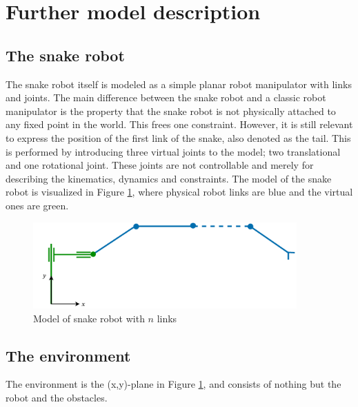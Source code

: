 \section{Further model description}

\subsection{The snake robot}
The snake robot itself is modeled as a simple planar robot manipulator with links and joints. The main difference between the snake robot and a classic robot manipulator is the property that the snake robot is not physically attached to any fixed point in the world. This frees one constraint. However, it is still relevant to express the position of the first link of the snake, also denoted as the tail. This is performed by introducing three virtual joints to the model; two translational and one rotational joint. These joints are not controllable and merely for describing the kinematics, dynamics and constraints. The model of the snake robot is visualized in Figure \ref{fig:2_kin}, where physical robot links are blue and the virtual ones are green.

\begin{figure}
    \centering
    \includegraphics[width=0.9\textwidth]{figures/modelspecs/superbasicsnake.pdf}
    \caption{Model of snake robot with $n$ links}
    \label{fig:2_kin}
\end{figure}


\subsection{The environment}
The environment is the (x,y)-plane in Figure \ref{fig:2_kin}, and consists of nothing but the robot and the obstacles.



